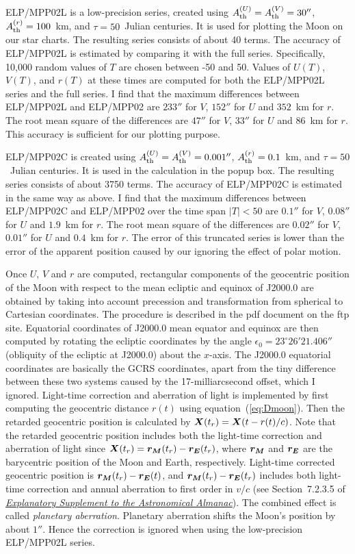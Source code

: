 \documentclass[12pt]{article}
\newcommand{\ve}[1]{\mbox{\boldmath $#1$}}
\newcommand{\expl}{\href{http://www.uscibooks.com/urban.htm}{\it Explanatory Supplement to the Astronomical Almanac}}
\begin{document}
ELP/MPP02L is a low-precision series, created using 
$A^{(U)}_{\rm th}=A^{(V)}_{\rm th}=30''$, $A^{(r)}_{\rm th}=100$~km, and $\tau = 50$~Julian centuries. It is used for plotting the Moon on our star charts. 
The resulting series consists of about 40 terms. 
The accuracy of ELP/MPP02L is estimated by comparing it with the full series. 
Specifically, 10,000 random values of $T$ are chosen between -50 and 50. Values of 
$U(T)$, $V(T)$, and $r(T)$ at these times are computed for both the ELP/MPP02L series and the 
full series. I find that the maximum differences between ELP/MPP02L and ELP/MPP02 
are $233''$ for $V$, $152''$ for $U$ and $352$~km for $r$. The root mean square 
of the differences are $47''$ for $V$, $33''$ for $U$ and $86$~km for $r$. This accuracy 
is sufficient for our plotting purpose.

ELP/MPP02C is created using $A^{(U)}_{\rm th}=A^{(V)}_{\rm th}=0.001''$, 
$A^{(r)}_{\rm th}=0.1$~km, and $\tau = 50$~Julian centuries. It is used in 
the calculation in the popup box. The resulting series consists of about 3750 terms. 
The accuracy of ELP/MPP02C is estimated in the same way as above. I find that 
the maximum differences between ELP/MPP02C and ELP/MPP02 over the time 
span $|T|<50$ are $0.1''$ for $V$, $0.08''$ for $U$ and $1.9$~km for $r$. 
The root mean square of the differences are $0.02''$ for $V$, $0.01''$ for 
$U$ and $0.4$~km for $r$. The error of this truncated series is lower than 
the error of the apparent position caused by our ignoring the effect of 
polar motion.

Once $U$, $V$ and $r$ are computed, rectangular components of the geocentric 
position of the Moon with respect to the mean ecliptic and equinox of J2000.0 
are obtained by taking into account precession and transformation from spherical 
to Cartesian coordinates. The procedure is described in the pdf document on the ftp site. 
Equatorial coordinates of J2000.0 mean equator and equinox are then computed 
by rotating the ecliptic coordinates by the angle $\epsilon_0=23^\circ 26' 21.406''$ 
(obliquity of the ecliptic at J2000.0) about the $x$-axis. 
The J2000.0 equatorial coordinates are basically the GCRS coordinates, 
apart from the tiny difference 
between these two systems caused by the 17-milliarcsecond offset, which I ignored. 
Light-time correction and aberration of light is implemented by first computing 
the geocentric distance $r(t)$ using equation~(\ref{eq:Dmoon}). Then the retarded 
geocentric position is calculated by $\ve{X}(t_r) = \ve{X}(t-r(t)/c)$. Note that 
the retarded geocentric position includes both the light-time correction and 
aberration of light since $\ve{X}(t_r) = \ve{r_M}(t_r)-\ve{r_E}(t_r)$, 
where $\ve{r_M}$ and $\ve{r_E}$ are the barycentric position of the Moon and 
Earth, respectively. Light-time corrected geocentric position is 
$\ve{r_M}(t_r)-\ve{r_E}(t)$, and $\ve{r_M}(t_r)-\ve{r_E}(t_r)$ includes 
both light-time correction and annual aberration to first order in $v/c$ 
(see Section~7.2.3.5 of \expl). The combined effect is called 
{\em planetary aberration}. Planetary aberration shifts the Moon's position 
by about $1''$. Hence the 
correction is ignored when using the low-precision ELP/MPP02L series. 
\end{document}
